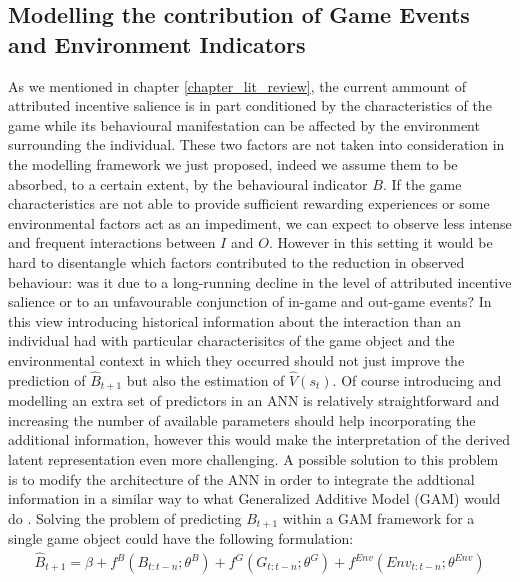 \subsection{Modelling the contribution of Game Events and Environment Indicators}
\label{modelling_env_and_game_elements}
As we mentioned in chapter \ref{chapter_lit_review}, the current ammount of attributed incentive salience is in part conditioned by the characteristics of the game while its behavioural manifestation can be affected by the environment surrounding the individual. These two factors are not taken into consideration in the modelling framework we just proposed, indeed we assume them to be absorbed, to a certain extent, by the behavioural indicator $B$. If the game characteristics are not able to provide sufficient rewarding experiences or some environmental factors act as an impediment, we can expect to observe less intense and frequent interactions between $I$ and $O$. However in this setting it would be hard to disentangle which factors contributed to the reduction in observed behaviour: was it due to a long-running decline in the level of attributed incentive salience or to an unfavourable conjunction of in-game and out-game events? In this view introducing historical information about the interaction than an individual had with particular characterisitcs of the game object and the environmental context in which they occurred should not just improve the prediction of $\widehat{B}_{t+1}$ but also the estimation of $\widehat{V}(s_t)$. Of course introducing and modelling an extra set of predictors in an ANN is relatively straightforward and increasing the number of available parameters should help incorporating the additional information, however this would make the interpretation of the derived latent representation even more challenging. A possible solution to this problem is to modify the architecture of the ANN in order to integrate the addtional information in a similar way to what Generalized Additive Model (GAM) would do \cite{hastie2017generalized}. Solving the problem of predicting $B_{t+1}$ within a GAM framework for a single game object could have the following formulation:
\begin{gather}
\label{gam}
    \widehat{B}_{t+1} = \beta + f^{B}(B_{t:t-n};\theta^{B}) + f^{G}(G_{t:t-n};\theta^{G}) + f^{Env}(Env_{t:t-n};\theta^{Env})
\end{gather}
